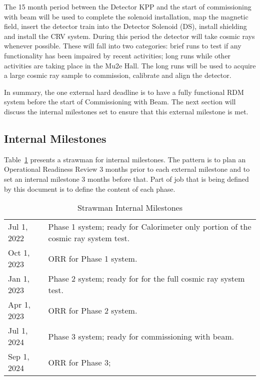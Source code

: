 The 15 month period between the Detector KPP and the start of commissioning with beam will be used
to complete the solenoid installation,
map the magnetic field,
insert the detector train into the Detector Solenoid (DS),
install shielding
and install the CRV system.
During this period the detector will take cosmic rays whenever possible.
These will fall into two categories:
brief runs to test if any functionality has been impaired by recent activities;
long runs while other activities are taking place in the Mu2e Hall.
The long runs will be used to acquire a large cosmic ray sample to
commission, calibrate and align the detector.

In summary, the one external hard deadline is to have a fully functional RDM system before the start of
Commissioning with Beam.
The next section will discuss the internal milestones set to ensure that this external milestone is met.

\subsection{Internal Milestones}
\label{ssec:InternalMilestones}

Table~\ref{tab:internalmilestones} presents a strawman for internal milestones.
The pattern is to plan an Operational Readiness Review 3 months prior to each external
milestone and to set an internal milestone 3 months before that.
Part of job that is being defined by this document is to define the content of each phase.


\begin{table}
\begin{center}
\caption[Strawman Internal Milestones]{Strawman Internal Milestones}
\label{tab:internalmilestones}
\begin{tabular}{ll}\hline
  Jul 1, 2022 & Phase 1 system; ready for Calorimeter only portion of the cosmic ray system test. \\
  Oct 1, 2023 & ORR for Phase 1 system. \\
  Jan 1, 2023 & Phase 2 system; ready for for the full cosmic ray system test. \\
  Apr 1, 2023 & ORR for Phase 2 system. \\
  Jul 1, 2024 & Phase 3 system; ready for commissioning with beam. \\
  Sep 1, 2024 & ORR for Phase 3; \\
   \hline
  \end{tabular}
\end{center}
\end{table}


